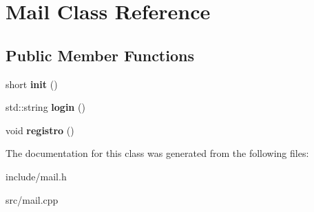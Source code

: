 \hypertarget{class_mail}{}\section{Mail Class Reference}
\label{class_mail}
\subsection*{Public Member Functions}
\begin{DoxyCompactItemize}
\item 
\mbox{\label{class_mail_a6d63a748bb9b2db873844c9070da9c75}} 
short {\bfseries init} ()
\item 
\mbox{\label{class_mail_a648ce3a374a0dd314d28814ff79d5e99}} 
std\+::string {\bfseries login} ()
\item 
\mbox{\label{class_mail_afde484de6479009fb6de703dab6d934f}} 
void {\bfseries registro} ()
\end{DoxyCompactItemize}


The documentation for this class was generated from the following files\+:\begin{DoxyCompactItemize}
\item 
include/mail.\+h\item 
src/mail.\+cpp\end{DoxyCompactItemize}
